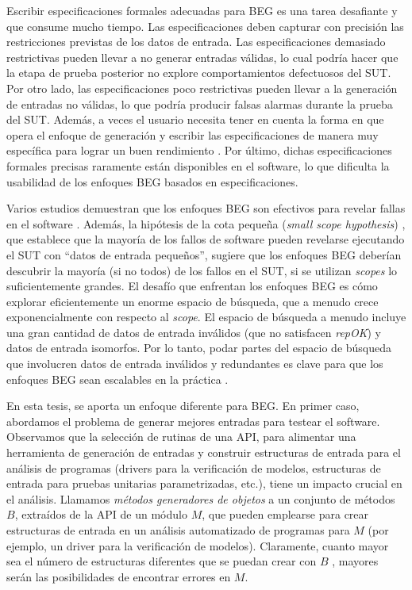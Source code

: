 Escribir especificaciones formales adecuadas para BEG es una tarea desafiante y que consume mucho tiempo. Las especificaciones deben capturar con precisión las restricciones previstas de los datos de entrada. Las especificaciones demasiado restrictivas pueden llevar a no generar entradas válidas, lo cual podría hacer que la etapa de prueba posterior no explore comportamientos defectuosos del SUT. Por otro lado, las especificaciones poco restrictivas pueden llevar a la generación de entradas no válidas, lo que podría producir falsas alarmas durante la prueba del SUT. Además, a veces el usuario necesita tener en cuenta la forma en que opera el enfoque de generación y escribir las especificaciones de manera muy específica para lograr un buen rendimiento \cite{Boyapati02}. Por último, dichas especificaciones formales precisas raramente están disponibles en el software, lo que dificulta la usabilidad de los enfoques BEG basados en especificaciones.

Varios estudios demuestran que los enfoques BEG son efectivos para revelar fallas en el software \cite{Marinov01, Khurshid01, Boyapati02, Sullivan04}. Además, la hipótesis de la cota pequeña (\textit{small scope hypothesis}) \cite{Andoni02}, que establece que la mayoría de los fallos de software pueden revelarse ejecutando el SUT con “datos de entrada pequeños”, sugiere que los enfoques BEG deberían descubrir la mayoría (si no todos) de los fallos en el SUT, si se utilizan \textit{scopes} lo suficientemente grandes. El desafío que enfrentan los enfoques BEG es cómo explorar eficientemente un enorme espacio de búsqueda, que a menudo crece exponencialmente con respecto al \textit{scope}. El espacio de búsqueda a menudo incluye una gran cantidad de datos de entrada inválidos (que no satisfacen \textit{repOK}) y datos de entrada isomorfos. Por lo tanto, podar partes del espacio de búsqueda que involucren datos de entrada inválidos y redundantes es clave para que los enfoques BEG sean escalables en la práctica \cite{Boyapati02}.


En esta tesis, se aporta un enfoque diferente para BEG.
En primer caso, abordamos el problema de generar mejores entradas para testear el software. Observamos que la selección de rutinas de una API, para alimentar una herramienta de generación de entradas y construir estructuras de entrada para el análisis de programas (drivers para la verificación de modelos, estructuras de entrada para pruebas unitarias parametrizadas, etc.), tiene un impacto crucial en el análisis. Llamamos \emph{métodos generadores de objetos} a un conjunto de métodos $B$, extraídos de la API de un módulo $M$, que pueden emplearse para crear estructuras de entrada en un análisis automatizado de programas para \( M \)  (por ejemplo, un driver para la verificación de modelos). Claramente, cuanto mayor sea el número de estructuras diferentes que se puedan crear con \( B \) , mayores serán las posibilidades de encontrar errores en \( M \).

